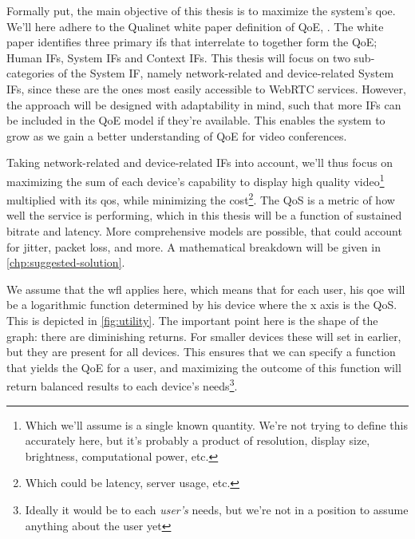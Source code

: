 Formally put, the main objective of this thesis is to maximize the system's \gls{qoe}. We'll here adhere to the Qualinet white paper definition of QoE,  \cite{qualinet}. The white paper identifies three primary \glspl{if} that interrelate to together form the QoE; Human IFs, System IFs and Context IFs. This thesis will focus on two sub-categories of the System IF, namely network-related and device-related System IFs, since these are the ones most easily accessible to WebRTC services. However, the approach will be designed with adaptability in mind, such that more IFs can be included in the QoE model if they're available. This enables the system to grow as we gain a better understanding of QoE for video conferences.

Taking network-related and device-related IFs into account, we'll thus focus on maximizing the sum of each device's capability to display high quality video\footnote{Which we'll assume is a single known quantity. We're not trying to define this accurately here, but it's probably a product of resolution, display size, brightness, computational power, etc.} multiplied with its \gls{qos}, while minimizing the cost\footnote{Which could be latency, server usage, etc.}. The QoS is a metric of how well the service is performing, which in this thesis will be a function of sustained bitrate and latency. More comprehensive models are possible, that could account for jitter, packet loss, and more. A mathematical breakdown will be given in \autoref{chp:suggested-solution}.

We assume that the \gls{wfl} applies here, which means that for each user, his \gls{qoe} will be a logarithmic function determined by his device where the x axis is the QoS. This is depicted in \autoref{fig:utility}. The important point here is the shape of the graph: there are diminishing returns. For smaller devices these will set in earlier, but they are present for all devices. This ensures that we can specify a function that yields the QoE for a user, and maximizing the outcome of this function will return balanced results to each device's needs\footnote{Ideally it would be to each \emph{user's} needs, but we're not in a position to assume anything about the user yet}.

